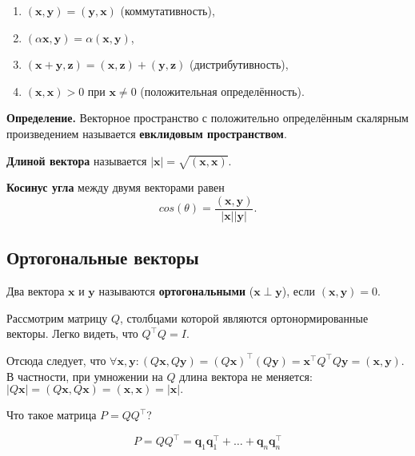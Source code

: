 \documentclass[11pt,a4paper]{article}
\providecommand{\tightlist}{%
      \setlength{\itemsep}{0pt}\setlength{\parskip}{0pt}}
\begin{document}
\begin{enumerate}
\def\labelenumi{\arabic{enumi}.}
\tightlist
\item
  \((\mathbf{x}, \mathbf{y}) = (\mathbf{y}, \mathbf{x})\)
  (коммутативность),
\item
  \((\alpha \mathbf{x}, \mathbf{y}) = \alpha (\mathbf{x}, \mathbf{y})\),
\item
  \((\mathbf{x} + \mathbf{y}, \mathbf{z}) = (\mathbf{x}, \mathbf{z}) + (\mathbf{y}, \mathbf{z})\)
  (дистрибутивность),
\item
  \((\mathbf{x}, \mathbf{x}) > 0\) при \(\mathbf{x} \ne 0\) (положительная определённость).
\end{enumerate}

\textbf{Определение.} Векторное пространство с положительно определённым скалярным произведением называется \textbf{евклидовым
пространством}.

\textbf{Длиной вектора} называется
\(|\mathbf{x}| = \sqrt{(\mathbf{x}, \mathbf{x})}\).

\textbf{Косинус угла} между двумя векторами равен
\[ cos(\theta) = \frac{(\mathbf{x}, \mathbf{y})}{|\mathbf{x}| |\mathbf{y}|}. \]

    \hypertarget{ux43eux440ux442ux43eux433ux43eux43dux430ux43bux44cux43dux44bux435-ux432ux435ux43aux442ux43eux440ux44b}{%
\subsection{Ортогональные
векторы}\label{ux43eux440ux442ux43eux433ux43eux43dux430ux43bux44cux43dux44bux435-ux432ux435ux43aux442ux43eux440ux44b}}

Два вектора \(\mathbf{x}\) и \(\mathbf{y}\) называются
\textbf{ортогональными} (\(\mathbf{x} \perp \mathbf{y}\)), если
\((\mathbf{x}, \mathbf{y}) = 0\).

Рассмотрим матрицу \(Q\), столбцами которой являются ортонормированные
векторы. Легко видеть, что \(Q^\top Q = I\).

Отсюда следует, что
\(\forall \mathbf{x}, \mathbf{y}: (Q\mathbf{x}, Q\mathbf{y}) = (Q\mathbf{x})^\top (Q\mathbf{y}) = \mathbf{x}^\top Q^\top Q \mathbf{y} = (\mathbf{x}, \mathbf{y})\).
В частности, при умножении на \(Q\) длина вектора не меняется:
\(|Q\mathbf{x}| = (Q\mathbf{x}, Q\mathbf{x}) = (\mathbf{x}, \mathbf{x}) = |\mathbf{x}|.\)

Что такое матрица \(P = Q Q^\top\)?

\[
  P = Q Q^\top = \mathbf{q}_1 \mathbf{q}_1^\top + \ldots + \mathbf{q}_n \mathbf{q}_n^\top
\]
\end{document}
